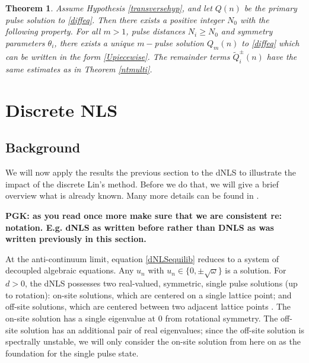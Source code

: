 \documentclass[12pt]{article}
\newtheorem{theorem}{Theorem}
\begin{document}
\begin{theorem}\label{transversemulti}
Assume Hypothesis \ref{transversehyp}, and let $Q(n)$ be the primary pulse solution to \eqref{diffeq}. Then there exists a positive integer $N_0$ with the following property. For all $m > 1$, pulse distances $N_i \geq N_0$ and symmetry parameters $\theta_i$, there exists a unique $m-$pulse solution $Q_m(n)$ to \eqref{diffeq} which can be written in the form \eqref{Upiecewise}. The remainder terms $\tilde{Q}_i^\pm(n)$ have the same estimates as in Theorem \ref{ntmulti}.
\end{theorem}

\section{Discrete NLS}\label{sec:dNLS}

\subsection{Background}

We will now apply the results the previous section to the 
dNLS to illustrate the impact of the discrete Lin's method. Before we do that, we will give a brief overview what is already known. Many more details can be found in \cite{Kevrekidis2009,pelinovsky_2011}. 

{\bf PGK: as you read once more make sure that we are consistent re: notation. E.g. dNLS as written before rather than DNLS as was written previously in this section.}

At the anti-continuum limit, equation \eqref{dNLSequilib} reduces to a system of decoupled algebraic equations. Any $u_n$ with $u_n \in \{ 0, \pm \sqrt{\omega}\}$ is a solution. For $d > 0$, the dNLS possesses two real-valued, symmetric, single pulse solutions (up to rotation): on-site solutions, which are centered on a single lattice point; and off-site solutions, which are centered between two adjacent lattice points \cite{Kevrekidis2009}. The on-site solution has a single eigenvalue at 0 from rotational symmetry. The off-site solution has an additional pair of real eigenvalues; since the off-site solution is spectrally unstable, we will only consider the on-site solution from here on as the foundation for the 
single pulse state. 
\end{document}
